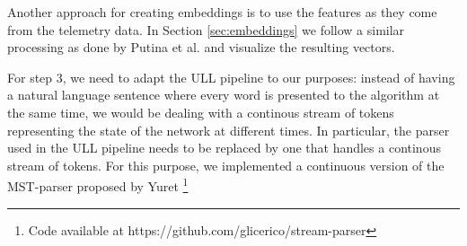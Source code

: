 Another approach for creating embeddings is to use the features as they come from the telemetry data.
In Section \ref{sec:embeddings} we follow a similar processing as done by Putina et al.\cite{putina_telemetry-based_2018} and visualize the resulting vectors.

For step 3, we need to adapt the ULL pipeline to our purposes: instead of having a natural language sentence where every word is presented to the algorithm at the same time, we would be dealing with a continous stream of tokens representing the state of the network at different times.
In particular, the parser used in the ULL pipeline needs to be replaced by one that handles a continous stream of tokens.
For this purpose, we implemented a continuous version of the MST-parser proposed by Yuret \cite{yuret_discovery_1998}\footnote{Code available at https://github.com/glicerico/stream-parser}
